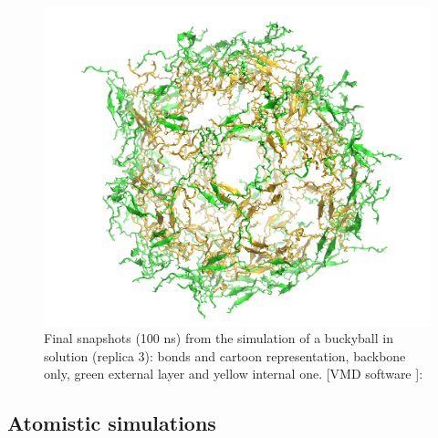\begin{figure}[t]
\centering
\includegraphics[width=0.5\linewidth]{3results_capsule/pics/staR3_render}
\caption[Atomistic run of buckyball in solution: final configuration]{Final snapshots (100 ns) from the simulation of a buckyball in solution (replica 3): bonds and cartoon representation, backbone only, green external layer and yellow internal one. [VMD software \citet{HUMP96}]: }
\label{fig:BTI_snap}
\end{figure}

\subsection{Atomistic simulations}

